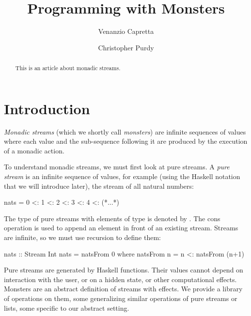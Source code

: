 \documentclass{jfp}
\begin{document}


\totalpg{\pageref{lastpage01}}

\title{Programming with Monsters}

\begin{authgrp}
\author{Venanzio Capretta}
\author{Christopher Purdy}
\end{authgrp}

\begin{abstract}
This is an article about monadic streams.
\end{abstract}

\maketitle

\section{Introduction}

{\em Monadic streams} (which we shortly call {\em monsters}) are infinite sequences of values where each value and the sub-sequence following it are produced by the execution of a monadic action.

To understand monadic streams, we must first look at pure streams.
A \emph{pure stream} is an infinite sequence of values, for example (using the Haskell notation that we will introduce later), the stream of all natural numbers:
\begin{haskell}
  nats = 0 <: 1 <: 2 <: 3 <: 4 <: (*...*)
\end{haskell}
The type of pure streams with elements of type  is denoted by . The cons operation \hcode{(<:)} is used to append an element in front of an existing stream. Streams are infinite, so we must use recursion to define them:
\begin{haskell}
nats :: Stream Int
nats = natsFrom 0 where
  natsFrom n = n <: natsFrom (n+1)
\end{haskell}

Pure streams are generated by Haskell functions.
Their values cannot depend on interaction with the user, or on a hidden state, or other computational effects.
Monsters are an abstract definition of streams with effects.
We provide a library of operations on them, some generalizing similar operations of pure streams or lists, some specific to our abstract setting.
\end{document}
